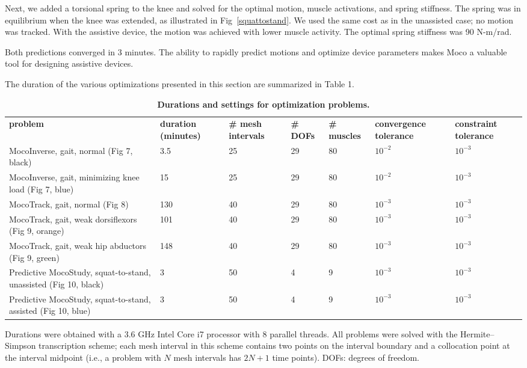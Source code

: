 \documentclass[10pt,letterpaper]{article}
\newlength\savedwidth
\newcommand\thickhline{\noalign{\global\savedwidth\arrayrulewidth\global\arrayrulewidth 2pt}%
\hline
\noalign{\global\arrayrulewidth\savedwidth}}
\begin{document}
Next, we added a torsional spring to the knee and solved for the optimal motion, muscle activations, and spring stiffness. The spring was in equilibrium when the knee was extended, as illustrated in Fig~\ref{squattostand}. We used the same cost as in the unassisted case; no motion was tracked. With the assistive device, the motion was achieved with lower muscle activity. The optimal spring stiffness was 90 N-m/rad.

Both predictions converged in 3 minutes. The ability to rapidly predict motions and optimize device parameters makes Moco a valuable tool for designing assistive devices.

The duration of the various optimizations presented in this section are summarized in Table 1.

\begin{table}[!ht]
    \begin{adjustwidth}{-2.25in}{0in} %
        \centering
        \caption{
            {\bf Durations and settings for optimization problems.}}
        \begin{tabular}{|P{12em}|p{5em}|p{5em}|l|l|p{6em}|p{5em}|}
            \hline
            {\bf problem} & {\bf duration (minutes)} & {\bf \# mesh intervals} & {\bf \# DOFs} & {\bf \# muscles} & {\bf convergence tolerance} & {\bf constraint tolerance} \\ \thickhline
            MocoInverse, gait, normal (Fig 7, black) & 3.5 & 25 & 29 & 80 & $10^{-2}$ & $10^{-3}$ \\ \hline
            MocoInverse, gait, minimizing knee load (Fig 7, blue) & 15 & 25 & 29 & 80 & $10^{-2}$ & $10^{-3}$ \\ \hline
            MocoTrack, gait, normal (Fig 8) & 130 & 40 & 29 & 80 & $10^{-3}$ & $10^{-3}$ \\ \hline
            MocoTrack, gait, weak dorsiflexors (Fig 9, orange) & 101 & 40 & 29 & 80 & $10^{-3}$ & $10^{-3}$ \\ \hline
            MocoTrack, gait, weak hip abductors (Fig 9, green) & 148 & 40 & 29 & 80 & $10^{-3}$ & $10^{-3}$ \\ \hline
            Predictive MocoStudy, squat-to-stand, unassisted (Fig 10, black) & 3 & 50 & 4 & 9 & $10^{-3}$ & $10^{-3}$ \\ \hline
            Predictive MocoStudy, squat-to-stand, assisted (Fig 10, blue) & 3 & 50 & 4 & 9 & $10^{-3}$ & $10^{-3}$ \\ \hline
        \end{tabular}
        \begin{flushleft}
            Durations were obtained with a
            3.6 GHz Intel Core i7 processor with 8 parallel threads.
            All problems were solved with the Hermite--Simpson transcription scheme;
            each mesh interval in this scheme contains two points on the interval boundary
            and a collocation point at the interval midpoint (i.e., a problem with $N$ mesh intervals has $2N + 1$ time points). DOFs: degrees of freedom.
        \end{flushleft}
        \label{tab:durations}
    \end{adjustwidth}
\end{table}
\end{document}
